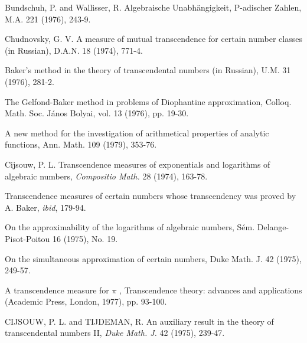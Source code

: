 \begin{hanglist}
    \item Bundschuh, P. and Wallisser, R. Algebraische Unabhängigkeit, P-adischer Zahlen, M.A. 221 (1976), 243-9.
    \item Chudnovsky, G. V. A measure of mutual transcendence for certain number classes (in Russian), D.A.N. 18 (1974), 771-4.
    \item \hspace{1.5em} Baker's method in the theory of transcendental numbers (in Russian), U.M. 31 (1976), 281-2.
    \item \hspace{1.5em} The Gelfond-Baker method in problems of Diophantine approximation, Colloq. Math. Soc. János Bolyai, vol. 13 (1976), pp. 19-30.
    \item \hspace{1.5em} A new method for the investigation of arithmetical properties of analytic functions, Ann. Math. 109 (1979), 353-76.
    \item Cijsouw, P. L. Transcendence measures of exponentials and logarithms of algebraic numbers, \textit{Compositio Math.} 28 (1974), 163-78.
    \item \hspace{1.5em} Transcendence measures of certain numbers whose transcendency was proved by A. Baker, \textit{ibid}, 179-94.
    \item \hspace{1.5em} On the approximability of the logarithms of algebraic numbers, Sém. Delange-Pisot-Poitou 16 (1975), No. 19.
    \item \hspace{1.5em} On the simultaneous approximation of certain numbers, Duke Math. J. 42 (1975), 249-57.
    \item \hspace{1.5em} A transcendence measure for  $\pi$ , Transcendence theory: advances and applications (Academic Press, London, 1977), pp. 93-100.
    \item CIJSOUW, P. L. and TIJDEMAN, R. An auxiliary result in the theory of transcendental numbers II, \textit{Duke Math. J.} 42 (1975), 239-47.

\end{hanglist}
